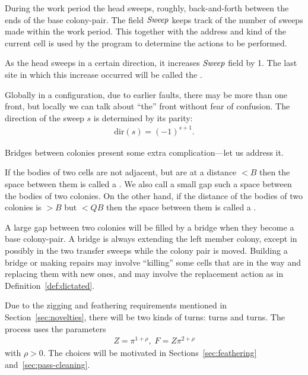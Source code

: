 \documentclass[11pt]{memoir}
\theoremstyle{definition} %
\newcommand{\fld}[1]{\ensuremath{\textit{#1\/}}}
\def\B{B}
\newcommand{\F}{F}
\newcommand{\passno}{\pi}
\newcommand{\Q}{Q} %
\newcommand{\Z}{Z} %
\newcommand{\dir}{\mathrm{dir}} %
\newcommand{\Sweep}{\fld{Sweep}} %
\begin{document}
During the work period the head sweeps, roughly, back-and-forth between
the ends of the base colony-pair.
The field \( \Sweep \) keeps track of the number of sweeps made within the work period.
This together with the address and kind of the current cell is used by the program to determine
the actions to be performed.

\begin{definition}[Front]\label{def:front}
As the head sweeps in a certain direction, it increases \( \Sweep \) field by 1.
  The last site in which this increase occurred will be called the . 
\end{definition}

Globally in a configuration, due to earlier faults, there may be more than one front, but locally
we can talk about ``the'' front without fear of confusion.
The direction of the sweep \( s \) is determined by its parity:
\begin{align*}
  \dir(s)=(-1)^{s + 1}.
\end{align*}

 Bridges between colonies present some extra complication---let us address it.

\begin{definition}[Gaps]\label{def:gaps}
If the bodies of two cells are not adjacent, but are at a distance \( <\B \) then the space
between them is called a .
We also call a small gap such a space between the bodies of two colonies.
On the other hand, if the distance of the bodies of two colonies is \( >\B \) 
but \( <\Q\B \) then the space between them is called a .
\end{definition}

A large gap between two colonies will be filled by a bridge when they become a base colony-pair.
A bridge is always extending the left member colony, except in possibly in the two transfer sweeps while
the colony pair is moved.
Building a bridge or making repairs may involve
``killing'' some cells that are in the way and replacing them with new ones, and
may involve the replacement action as in Definition~\ref{def:dictated}.

 Due to the zigging and feathering requirements mentioned in Section~\ref{sec:novelties},
 there will be two kinds of turns:  turns and  turns.
 The process uses the parameters
\begin{align}\label{eq:FDef}
 \Z = \passno^{1+\rho},\; \F = \Z\passno^{2+\rho}
\end{align}
with \( \rho>0 \).
The choices will be motivated in Sections~\ref{sec:feathering} and~\ref{sec:pass-cleaning}.
\end{document}
